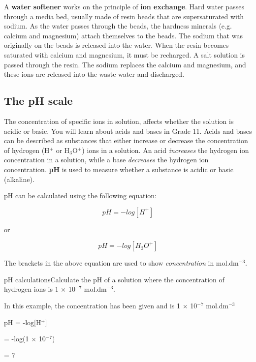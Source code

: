 A \textbf{water softener} works on the principle of \textbf{ion exchange}. Hard water passes through a media bed, usually made of resin beads that are supersaturated with sodium. As the water passes through the beads, the hardness minerals (e.g. calcium and magnesium) attach themselves to the beads. The sodium that was originally on the beads is released into the water. When the resin becomes saturated with calcium and magnesium, it must be recharged. A salt solution is passed through the resin. The sodium replaces the calcium and magnesium, and these ions are released into the waste water and discharged. 

\subsection{The pH scale}

The concentration of specific ions in solution, affects whether the solution is acidic or basic. You will learn about acids and bases in Grade 11. Acids and bases can be described as substances that either increase or decrease the concentration of hydrogen (H$^{+}$ or H$_{3}$O$^{+}$) ions in a solution. An acid \textit{increases} the hydrogen ion concentration in a solution, while a base \textit{decreases} the hydrogen ion concentration. \textbf{pH} is used to measure whether a substance is acidic or basic (alkaline).


pH can be calculated using the following equation:

\begin{equation*}
pH = -log[H^{+}]
\end{equation*} 

or

\begin{equation*}
pH = -log[H_{3}O^{+}]
\end{equation*} 

The brackets in the above equation are used to show \textit{concentration} in mol.dm$^{-3}$. 

\begin{wex}{pH calculations}{Calculate the pH of a solution where the concentration of hydrogen ions is 1 $\times$ 10$^{-7}$ mol.dm$^{-3}$.\\}

{

In this example, the concentration has been given and is 1 $\times$ 10$^{-7}$ mol.dm$^{-3}$\\
}
{

pH = -log[H$^{+}$]

= -log(1 $\times$ 10$^{-7}$)

= 7
}
\end{wex}

